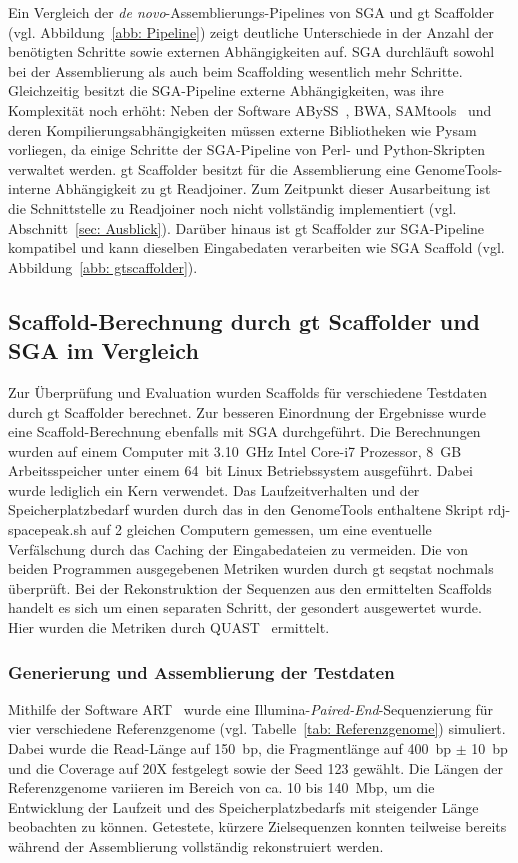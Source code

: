 \documentclass[a4paper,11pt,parskip,abstract=on]{scrartcl}
\begin{document}
Ein Vergleich der \textit{de novo}-Assemblierungs-Pipelines von SGA und gt
Scaffolder (vgl. Abbildung~\ref{abb: Pipeline}) zeigt deutliche Unterschiede
in der Anzahl der benötigten Schritte sowie externen Abhängigkeiten auf.
SGA durchläuft sowohl bei der Assemblierung als auch beim Scaffolding wesentlich
mehr Schritte. Gleichzeitig besitzt die SGA-Pipeline externe Abhängigkeiten,
was ihre Komplexität noch erhöht: Neben der Software ABySS~\cite{abyss}, BWA,
SAMtools~\cite{Li:2009st} und deren Kompilierungsabhängigkeiten müssen externe
Bibliotheken wie Pysam vorliegen, da einige Schritte der SGA-Pipeline von Perl-
und Python-Skripten verwaltet werden.
gt Scaffolder besitzt für die Assemblierung eine GenomeTools-interne
Abhängigkeit zu gt Readjoiner. Zum Zeitpunkt dieser Ausarbeitung ist die
Schnittstelle zu Readjoiner noch nicht vollständig implementiert
(vgl. Abschnitt~\ref{sec: Ausblick}). Darüber hinaus ist gt Scaffolder zur
SGA-Pipeline kompatibel und kann dieselben Eingabedaten verarbeiten wie
SGA Scaffold (vgl. Abbildung~\ref{abb: gtscaffolder}).

\subsection{Scaffold-Berechnung durch gt Scaffolder und SGA im Vergleich} Zur
Überprüfung und Evaluation wurden Scaffolds für verschiedene Testdaten durch
gt Scaffolder berechnet. Zur besseren Einordnung der Ergebnisse wurde eine
Scaffold-Berechnung ebenfalls mit SGA durchgeführt. Die Berechnungen wurden
auf einem Computer mit \SI{3.10}{GHz} Intel Core-i7 Prozessor, \SI{8}{GB}
Arbeitsspeicher unter einem \SI{64}{bit} Linux Betriebssystem ausgeführt.
Dabei wurde lediglich ein Kern verwendet. Das Laufzeitverhalten und der
Speicherplatzbedarf wurden durch das in den GenomeTools enthaltene Skript
rdj-spacepeak.sh auf 2 gleichen Computern gemessen, um eine eventuelle
Verfälschung durch das Caching der Eingabedateien zu vermeiden. Die von beiden
Programmen ausgegebenen Metriken wurden durch gt seqstat nochmals überprüft.
Bei der Rekonstruktion der Sequenzen aus den ermittelten Scaffolds handelt es
sich um einen separaten Schritt, der gesondert ausgewertet wurde. Hier wurden
die Metriken durch QUAST~\cite{Gurevich:2013je} ermittelt.

\subsubsection*{Generierung und Assemblierung der Testdaten}
\label{sec: Testdaten}
Mithilfe der Software ART~\cite{Huang:2012kq} wurde eine
Illumina-\textit{Paired-End}-Sequenzierung für vier verschiedene Referenzgenome
(vgl. Tabelle~\ref{tab: Referenzgenome}) simuliert. Dabei wurde die Read-Länge
auf \SI{150}{bp}, die Fragmentlänge auf \SI{400}{bp} $\pm$ \SI{10}{bp} und die Coverage auf
20X festgelegt sowie der Seed 123 gewählt. Die Längen der Referenzgenome
variieren im Bereich von ca. 10 bis \SI{140}{Mbp}, um die Entwicklung der Laufzeit
und des Speicherplatzbedarfs mit steigender Länge beobachten zu können.
Getestete, kürzere Zielsequenzen konnten teilweise bereits während der
Assemblierung vollständig rekonstruiert werden.
\end{document}
